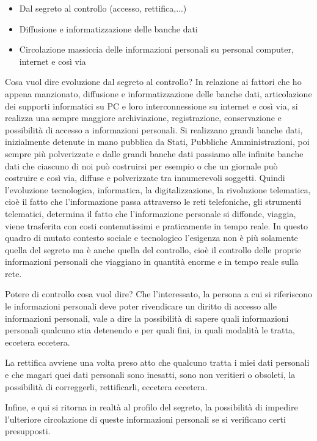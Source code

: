 \begin{itemize}
    \item Dal segreto al controllo (accesso, rettifica,...)
    \item Diffusione e informatizzazione delle banche dati
    \item Circolazione massiccia delle informazioni personali su personal computer, internet e così via
\end{itemize}

Cosa vuol dire evoluzione dal segreto al controllo? In relazione ai fattori che ho appena manzionato, diffusione e informatizzazione delle banche dati, articolazione dei supporti informatici su PC e loro interconnessione su internet e così via, si realizza una sempre maggiore archiviazione, registrazione, conservazione e possibilità di accesso a informazioni personali. 
Si realizzano grandi banche dati, inizialmente detenute in mano pubblica da Stati, Pubbliche Amministrazioni, poi sempre più polverizzate e dalle grandi banche dati passiamo alle infinite banche dati che ciascuno di noi può costruirsi per esempio o che un giornale può costruire e così via, diffuse e polverizzate tra innumerevoli soggetti. 
Quindi l'evoluzione tecnologica, informatica, la digitalizzazione, la rivoluzione telematica, cioè il fatto che l'informazione passa attraverso le reti telefoniche, gli strumenti telematici, determina il fatto che l'informazione personale si diffonde, viaggia, viene trasferita con costi contenutissimi e praticamente in tempo reale. In questo quadro di mutato contesto sociale e tecnologico l'esigenza non è più solamente quella del segreto ma è anche quella del controllo, cioè il controllo delle proprie informazioni personali che viaggiano in quantità enorme e in tempo reale sulla rete. 

Potere di controllo cosa vuol dire? Che l'interessato, la persona a cui si riferiscono le informazioni personali deve poter rivendicare un diritto di accesso alle informazioni personali, vale a dire la possibilità di sapere quali informazioni personali qualcuno stia detenendo e per quali fini, in quali modalità le tratta, eccetera eccetera. 

La rettifica avviene una volta preso atto che qualcuno tratta i miei dati personali e che magari quei dati personali sono inesatti, sono non veritieri o obsoleti, la possibilità di correggerli, rettificarli, eccetera eccetera. 

Infine, e qui si ritorna in realtà al profilo del segreto, la possibilità di impedire l'ulteriore circolazione di queste informazioni personali se si verificano certi presupposti. 

